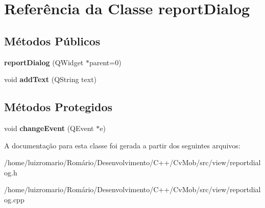 \hypertarget{classreportDialog}{
\section{Referência da Classe reportDialog}
\label{classreportDialog}
}
\subsection*{Métodos Públicos}
\begin{DoxyCompactItemize}
\item 
\hypertarget{classreportDialog_a5cb71beae46171c6134f234cd8d147fd}{
{\bfseries reportDialog} (QWidget $\ast$parent=0)}
\label{classreportDialog_a5cb71beae46171c6134f234cd8d147fd}

\item 
\hypertarget{classreportDialog_ab3f1ccaac2ef210a9810f48a62f60edf}{
void {\bfseries addText} (QString text)}
\label{classreportDialog_ab3f1ccaac2ef210a9810f48a62f60edf}

\end{DoxyCompactItemize}
\subsection*{Métodos Protegidos}
\begin{DoxyCompactItemize}
\item 
\hypertarget{classreportDialog_a4a286a1450b04c0884915de8749d165c}{
void {\bfseries changeEvent} (QEvent $\ast$e)}
\label{classreportDialog_a4a286a1450b04c0884915de8749d165c}

\end{DoxyCompactItemize}


A documentação para esta classe foi gerada a partir dos seguintes arquivos:\begin{DoxyCompactItemize}
\item 
/home/luizromario/Romário/Desenvolvimento/C++/CvMob/src/view/reportdialog.h\item 
/home/luizromario/Romário/Desenvolvimento/C++/CvMob/src/view/reportdialog.cpp\end{DoxyCompactItemize}
